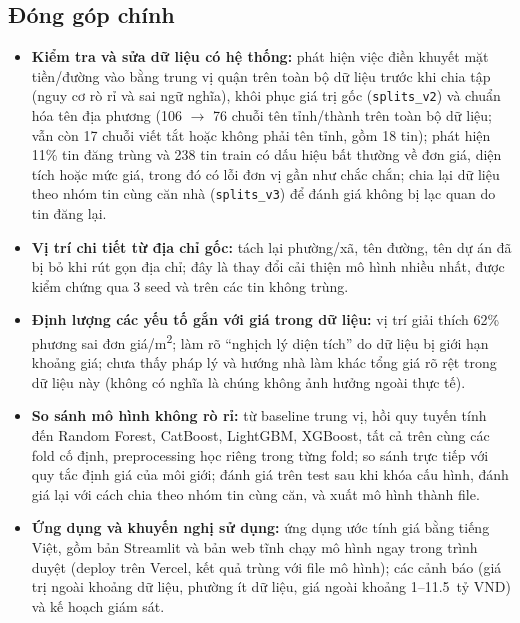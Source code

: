 \documentclass[11pt]{article}
\newcommand{\ty}{tỷ VND}
\begin{document}
\subsection{Đóng góp chính}

\begin{itemize}
    \item \textbf{Kiểm tra và sửa dữ liệu có hệ thống:} phát hiện việc điền khuyết mặt tiền/đường vào
          bằng trung vị quận trên toàn bộ dữ liệu trước khi chia tập (nguy cơ rò rỉ và sai ngữ nghĩa),
          khôi phục giá trị gốc (\texttt{splits\_v2}) và chuẩn hóa tên địa phương (106 $\rightarrow$ 76
          chuỗi tên tỉnh/thành trên toàn bộ dữ liệu; vẫn còn 17 chuỗi viết tắt hoặc không phải tên tỉnh, gồm 18 tin);
          phát hiện 11\% tin đăng trùng và 238 tin train có dấu hiệu bất thường về
          đơn giá, diện tích hoặc mức giá, trong đó có lỗi đơn vị gần như chắc chắn; chia lại dữ liệu theo nhóm
          tin cùng căn nhà (\texttt{splits\_v3}) để đánh giá không bị lạc quan do tin đăng lại.
    \item \textbf{Vị trí chi tiết từ địa chỉ gốc:} tách lại phường/xã, tên đường, tên dự án đã bị bỏ khi rút
          gọn địa chỉ; đây là thay đổi cải thiện mô hình nhiều nhất, được kiểm chứng qua 3 seed và trên các tin
          không trùng.
    \item \textbf{Định lượng các yếu tố gắn với giá trong dữ liệu:} vị trí giải thích 62\% phương sai đơn
          giá/m\textsuperscript{2}; làm rõ ``nghịch lý diện tích'' do dữ liệu bị giới hạn khoảng giá; chưa thấy pháp
          lý và hướng nhà làm khác tổng giá rõ rệt trong dữ liệu này (không có nghĩa là chúng không ảnh hưởng ngoài thực tế).
    \item \textbf{So sánh mô hình không rò rỉ:} từ baseline trung vị, hồi quy tuyến tính đến Random Forest,
          CatBoost, LightGBM, XGBoost, tất cả trên cùng các fold cố định, preprocessing học riêng trong từng
          fold; so sánh trực tiếp với quy tắc định giá của môi giới; đánh giá trên test sau khi khóa cấu hình,
          đánh giá lại với cách chia theo nhóm tin cùng căn, và xuất mô hình thành file.
    \item \textbf{Ứng dụng và khuyến nghị sử dụng:} ứng dụng ước tính giá bằng tiếng Việt, gồm bản Streamlit và bản
          web tĩnh chạy mô hình ngay trong trình duyệt (deploy trên Vercel, kết quả trùng với file mô hình); các cảnh báo
          (giá trị ngoài khoảng dữ liệu, phường ít dữ liệu, giá ngoài khoảng 1--11.5~\ty) và kế hoạch giám sát.
\end{itemize}
\end{document}
